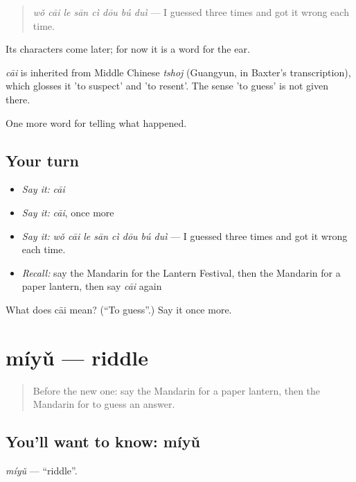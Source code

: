 \begin{quote}
\emph{wǒ cāi le sān cì dōu bú duì} — I guessed three times and got it wrong each time.
\end{quote}

Its characters come later; for now it is a word for the ear.

\begin{cousinweb}
\emph{cāi} is inherited from Middle Chinese \emph{tshoj} (Guangyun, in Baxter's transcription), which glosses it 'to suspect' and 'to resent'. The sense 'to guess' is not given there.
\end{cousinweb}

\begin{grammarlens}[title={What you've built}]
One more word for telling what happened.
\end{grammarlens}

\subsection*{Your turn}
\begin{itemize}
\raggedright
  \item \emph{Say it:} \emph{cāi}
  \item \emph{Say it:} \emph{cāi}, once more
  \item \emph{Say it:} \emph{wǒ cāi le sān cì dōu bú duì} — I guessed three times and got it wrong each time.
  \item \emph{Recall:} say the Mandarin for the Lantern Festival, then the Mandarin for a paper lantern, then say \emph{cāi} again
\end{itemize}

\begin{tcolorbox}[breakable,colback=teal!4,colframe=teal!35!black,title={Before you move on}]
What does cāi mean? (\textquotedblleft{}To guess\textquotedblright{}.) Say it once more.
\end{tcolorbox}
\section[míyǔ]{míyǔ — riddle}

\label{lesson:ZH-C335-miyu}



\begin{quote}
Before the new one: say the Mandarin for a paper lantern, then the Mandarin for to guess an answer.
\end{quote}

\subsection*{You'll want to know: míyǔ}
\emph{míyǔ} — \textquotedblleft{}riddle\textquotedblright{}.

